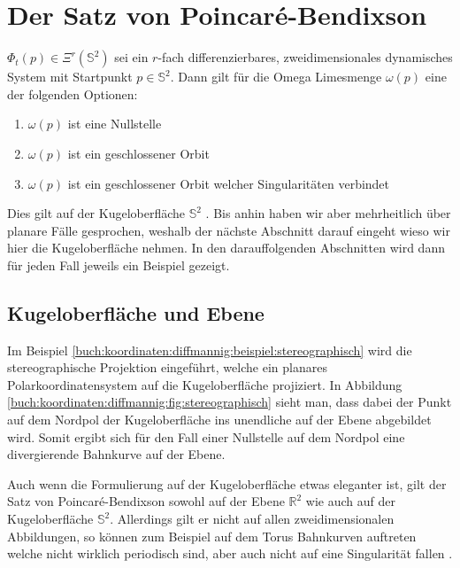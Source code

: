 \section{Der Satz von Poincaré-Bendixson} \label{poinbendix:section:poinbendix}

\begin{satz}
\label{poinbendix:satz:poinbendix}
$\Phi_t(p) \in \Xi^r(\mathbb{S}^2)$ sei ein $r$-fach differenzierbares, zweidimensionales dynamisches System mit Startpunkt $p \in \mathbb{S}^2$.
Dann gilt für die Omega Limesmenge $\omega(p)$ eine der folgenden Optionen:
\begin{enumerate}
\item $\omega(p)$ ist eine Nullstelle
\item $\omega(p)$ ist ein geschlossener Orbit
\item $\omega(p)$ ist ein geschlossener Orbit welcher Singularitäten verbindet
\end{enumerate}
\end{satz}

Dies gilt auf der Kugeloberfläche $\mathbb{S}^2$ \cite{poinbendix:melo}.
Bis anhin haben wir aber mehrheitlich über planare Fälle gesprochen, weshalb der nächste Abschnitt darauf eingeht wieso wir hier die Kugeloberfläche nehmen.
In den darauffolgenden Abschnitten wird dann für jeden Fall jeweils ein Beispiel gezeigt.

\subsection{Kugeloberfläche und Ebene} \label{poinbendix:subsection:kugeloberflaeche}

Im Beispiel \ref{buch:koordinaten:diffmannig:beispiel:stereographisch} wird die stereographische Projektion eingeführt, welche ein planares Polarkoordinatensystem auf die Kugeloberfläche projiziert.
In Abbildung \ref{buch:koordinaten:diffmannig:fig:stereographisch} sieht man, dass dabei der Punkt auf dem Nordpol der Kugeloberfläche ins unendliche auf der Ebene abgebildet wird.
Somit ergibt sich für den Fall einer Nullstelle auf dem Nordpol eine divergierende Bahnkurve auf der Ebene.

Auch wenn die Formulierung auf der Kugeloberfläche etwas eleganter ist, gilt der Satz von Poincaré-Bendixson sowohl auf der Ebene $\mathbb{R}^2$ wie auch auf der Kugeloberfläche $\mathbb{S}^2$.
Allerdings gilt er nicht auf allen zweidimensionalen Abbildungen, so können zum Beispiel auf dem Torus Bahnkurven auftreten welche nicht wirklich periodisch sind, aber auch nicht auf eine Singularität fallen \cite{poinbendix:wiki}.


